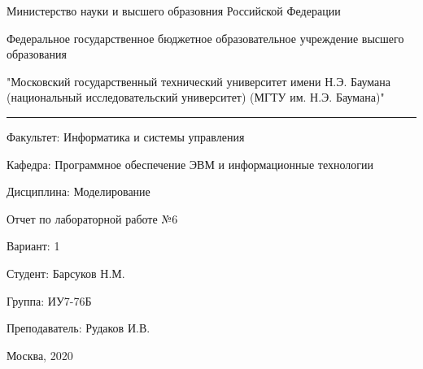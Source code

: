 \begin{center}
	Министерство науки и высшего образовния Российской Федерации
		
	Федеральное государственное бюджетное образовательное учреждение 
	высшего образования
	
	"Московский государственный технический университет имени Н.Э. Баумана (национальный исследовательский университет) (МГТУ им. Н.Э. Баумана)"
\end{center}

\hrule

\begin{flushleft}
	Факультет: Информатика и системы управления
	
	Кафедра: Программное обеспечение ЭВМ и информационные технологии
	
	Дисциплина: Моделирование
\end{flushleft}

\vspace{2cm}

\begin{center}
	Отчет по лабораторной работе №6
	
	Вариант: 1
\end{center}

\vspace{2cm}

\begin{flushleft}
	Студент: Барсуков Н.М.

	Группа: ИУ7-76Б
	
	Преподаватель: Рудаков И.В.
\end{flushleft}

\vspace*{\fill}
\begin{center}
	Москва, 2020
\end{center}
